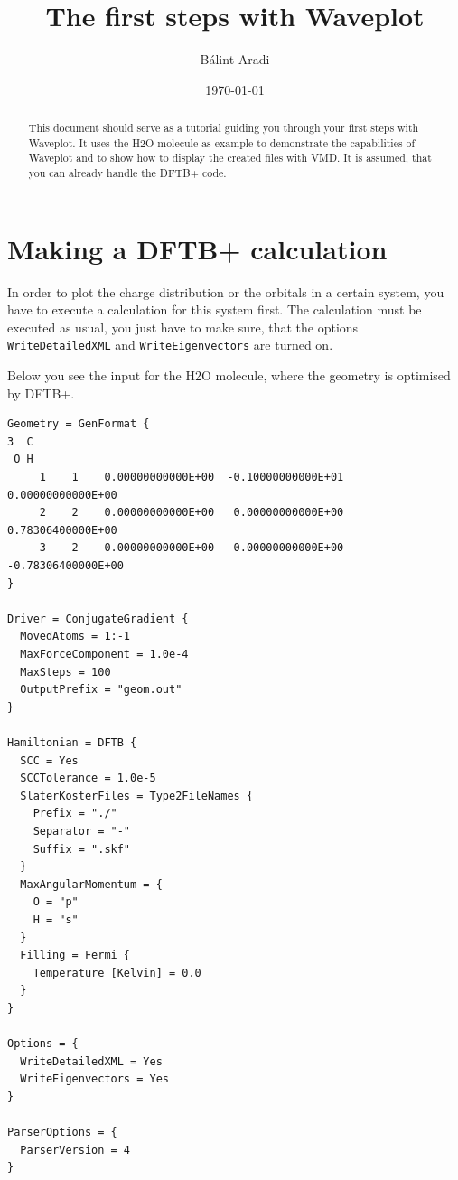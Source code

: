 

\title{The first steps with Waveplot}
\author{B\'alint Aradi}
\date{\today}



\maketitle

\begin{abstract}
  This document should serve as a tutorial guiding you through your
  first steps with Waveplot. It uses the H2O molecule as example to
  demonstrate the capabilities of Waveplot and to show how to display
  the created files with VMD. It is assumed, that you can already
  handle the DFTB+ code.
\end{abstract}

\tableofcontents


\section{Making a DFTB+ calculation}

In order to plot the charge distribution or the orbitals in a certain
system, you have to execute a \dftbp{} calculation for this system
first. The calculation must be executed as usual, you just have to
make sure, that the options \verb|WriteDetailedXML| and
\verb|WriteEigenvectors| are turned on.

Below you see the input for the H2O molecule, where the geometry is
optimised by DFTB+.

\begin{verbatim}
Geometry = GenFormat {
3  C
 O H
     1    1    0.00000000000E+00  -0.10000000000E+01   0.00000000000E+00
     2    2    0.00000000000E+00   0.00000000000E+00   0.78306400000E+00
     3    2    0.00000000000E+00   0.00000000000E+00  -0.78306400000E+00
}

Driver = ConjugateGradient {
  MovedAtoms = 1:-1
  MaxForceComponent = 1.0e-4
  MaxSteps = 100
  OutputPrefix = "geom.out"
}

Hamiltonian = DFTB {
  SCC = Yes
  SCCTolerance = 1.0e-5
  SlaterKosterFiles = Type2FileNames {
    Prefix = "./"
    Separator = "-"
    Suffix = ".skf"
  }
  MaxAngularMomentum = {
    O = "p"
    H = "s"
  }
  Filling = Fermi {
    Temperature [Kelvin] = 0.0
  }
}

Options = {
  WriteDetailedXML = Yes
  WriteEigenvectors = Yes
}

ParserOptions = {
  ParserVersion = 4
}
\end{verbatim}

